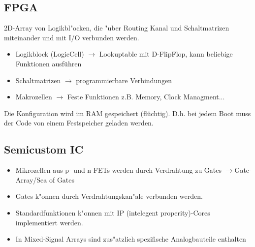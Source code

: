 \subsection{FPGA}
2D-Array von Logikbl"ocken, die "uber Routing Kanal und Schaltmatrizen miteinander und mit I/O verbunden werden.
\begin{itemize}
	\setlength{\itemsep}{1pt}
  \setlength{\parskip}{0pt}
  \setlength{\parsep}{0pt}
  
	\item Logikblock (LogicCell) $\rightarrow$ Lookuptable mit D-FlipFlop, kann beliebige Funktionen ausführen
	\item Schaltmatrizen $\rightarrow$ programmierbare Verbindungen
	\item Makrozellen $\rightarrow$ Feste Funktionen z.B. Memory, Clock Managment...
\end{itemize}
Die Konfiguration wird im RAM gespeichert (flüchtig). D.h. bei jedem Boot muss der Code von einem Festspeicher geladen werden.

%
%


\subsection{Semicustom IC}
\begin{itemize}
	\setlength{\itemsep}{1pt}
  \setlength{\parskip}{0pt}
  \setlength{\parsep}{0pt}
  
	\item Mikrozellen aus p- und n-FETs werden durch Verdrahtung zu Gates 			
		$\rightarrow$Gate-Array/Sea of Gates
	\item Gates k"onnen durch Verdrahtungskan"ale verbunden werden.
	\item Standardfunktionen k"onnen mit IP (intelegent properity)-Cores implementiert werden.
	\item In Mixed-Signal Arrays sind zus"atzlich spezifische Analogbauteile enthalten
\end{itemize}	
	
